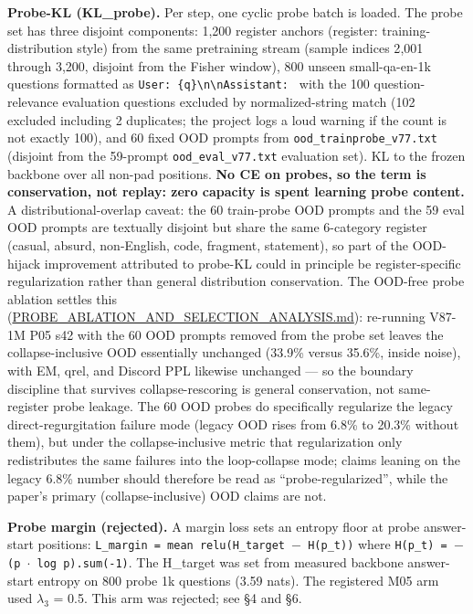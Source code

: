 \documentclass[11pt]{article}
\begin{document}
\textbf{Probe-KL (KL\_probe).} Per step, one cyclic probe batch is loaded. The probe set has three disjoint components: 1{,}200 register anchors (register: training-distribution style) from the same pretraining stream (sample indices 2{,}001 through 3{,}200, disjoint from the Fisher window), 800 unseen small-qa-en-1k questions formatted as \texttt{User: \{q\}\textbackslash n\textbackslash nAssistant: } with the 100 question-relevance evaluation questions excluded by normalized-string match (102 excluded including 2 duplicates; the project logs a loud warning if the count is not exactly 100), and 60 fixed OOD prompts from \texttt{ood\_trainprobe\_v77.txt} (disjoint from the 59-prompt \texttt{ood\_eval\_v77.txt} evaluation set). KL to the frozen backbone over all non-pad positions. \textbf{No CE on probes, so the term is conservation, not replay: zero capacity is spent learning probe content.} A distributional-overlap caveat: the 60 train-probe OOD prompts and the 59 eval OOD prompts are textually disjoint but share the same 6-category register (casual, absurd, non-English, code, fragment, statement), so part of the OOD-hijack improvement attributed to probe-KL could in principle be register-specific regularization rather than general distribution conservation. The OOD-free probe ablation settles this (\href{https://github.com/llaa33219/MicroMixer-4/blob/4bb630413dfa58ef3141291e121ab8c006d03235/PROBE_ABLATION_AND_SELECTION_ANALYSIS.md}{PROBE\_ABLATION\_AND\_SELECTION\_ANALYSIS.md}): re-running V87-1M P05 s42 with the 60 OOD prompts removed from the probe set leaves the collapse-inclusive OOD essentially unchanged (33.9\% versus 35.6\%, inside noise), with EM, qrel, and Discord PPL likewise unchanged --- so the boundary discipline that survives collapse-rescoring is general conservation, not same-register probe leakage. The 60 OOD probes do specifically regularize the legacy direct-regurgitation failure mode (legacy OOD rises from 6.8\% to 20.3\% without them), but under the collapse-inclusive metric that regularization only redistributes the same failures into the loop-collapse mode; claims leaning on the legacy 6.8\% number should therefore be read as ``probe-regularized'', while the paper's primary (collapse-inclusive) OOD claims are not.

\textbf{Probe margin (rejected).} A margin loss sets an entropy floor at probe answer-start positions: \texttt{L\_margin = mean relu(H\_target $-$ H(p\_t))} where \texttt{H(p\_t) = $-$(p $\cdot$ log p).sum(-1)}. The H\_target was set from measured backbone answer-start entropy on 800 probe 1k questions (3.59 nats). The registered M05 arm used $\lambda_3$ = 0.5. This arm was rejected; see \S4 and \S6.
\end{document}
